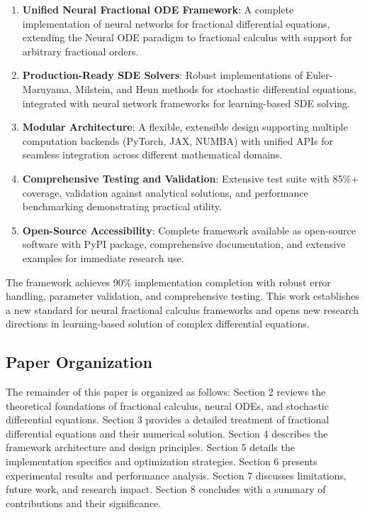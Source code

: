 \begin{enumerate}
    \item \textbf{Unified Neural Fractional ODE Framework}: A complete implementation of neural networks for fractional differential equations, extending the Neural ODE paradigm to fractional calculus with support for arbitrary fractional orders.
    
    \item \textbf{Production-Ready SDE Solvers}: Robust implementations of Euler-Maruyama, Milstein, and Heun methods for stochastic differential equations, integrated with neural network frameworks for learning-based SDE solving.
    
    \item \textbf{Modular Architecture}: A flexible, extensible design supporting multiple computation backends (PyTorch, JAX, NUMBA) with unified APIs for seamless integration across different mathematical domains.
    
    \item \textbf{Comprehensive Testing and Validation}: Extensive test suite with 85\%+ coverage, validation against analytical solutions, and performance benchmarking demonstrating practical utility.
    
    \item \textbf{Open-Source Accessibility}: Complete framework available as open-source software with PyPI package, comprehensive documentation, and extensive examples for immediate research use.
\end{enumerate}

The framework achieves 90\% implementation completion with robust error handling, parameter validation, and comprehensive testing. This work establishes a new standard for neural fractional calculus frameworks and opens new research directions in learning-based solution of complex differential equations.

\subsection{Paper Organization}

The remainder of this paper is organized as follows: Section 2 reviews the theoretical foundations of fractional calculus, neural ODEs, and stochastic differential equations. Section 3 provides a detailed treatment of fractional differential equations and their numerical solution. Section 4 describes the framework architecture and design principles. Section 5 details the implementation specifics and optimization strategies. Section 6 presents experimental results and performance analysis. Section 7 discusses limitations, future work, and research impact. Section 8 concludes with a summary of contributions and their significance.

